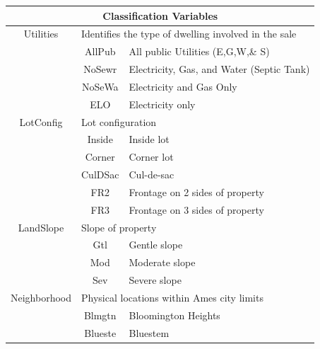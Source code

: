 \documentclass[11pt]{scrartcl} %
\begin{document}
\begin{center}
\begin{tabular}{c c c c c c}
\hline
\multicolumn{6}{|c|}{Classification Variables}\\
\hline
\multicolumn{2}{|c}{Utilities} & \multicolumn{4}{l|}{Identifies the type of dwelling involved in the sale}\\ 
\multicolumn{2}{|c}{} & \multicolumn{1}{c}{AllPub} & \multicolumn{3}{l|}{All public Utilities (E,G,W,\& S)	}\\
\multicolumn{2}{|c}{} & \multicolumn{1}{c}{NoSewr} & \multicolumn{3}{l|}{Electricity, Gas, and Water (Septic Tank)}\\
\multicolumn{2}{|c}{} & \multicolumn{1}{c}{NoSeWa} & \multicolumn{3}{l|}{Electricity and Gas Only}\\
\multicolumn{2}{|c}{} & \multicolumn{1}{c}{ELO} & \multicolumn{3}{l|}{Electricity only}\\
\hline
\multicolumn{2}{|c}{LotConfig} & \multicolumn{4}{l|}{Lot configuration}\\ 
\multicolumn{2}{|c}{} & \multicolumn{1}{c}{Inside} & \multicolumn{3}{l|}{Inside lot}\\
\multicolumn{2}{|c}{} & \multicolumn{1}{c}{Corner} & \multicolumn{3}{l|}{Corner lot}\\
\multicolumn{2}{|c}{} & \multicolumn{1}{c}{CulDSac} & \multicolumn{3}{l|}{Cul-de-sac}\\
\multicolumn{2}{|c}{} & \multicolumn{1}{c}{FR2} & \multicolumn{3}{l|}{Frontage on 2 sides of property}\\
\multicolumn{2}{|c}{} & \multicolumn{1}{c}{FR3} & \multicolumn{3}{l|}{Frontage on 3 sides of property}\\
\hline
\multicolumn{2}{|c}{LandSlope} & \multicolumn{4}{l|}{Slope of property}\\ 
\multicolumn{2}{|c}{} & \multicolumn{1}{c}{Gtl} & \multicolumn{3}{l|}{Gentle slope}\\
\multicolumn{2}{|c}{} & \multicolumn{1}{c}{Mod} & \multicolumn{3}{l|}{Moderate slope}\\
\multicolumn{2}{|c}{} & \multicolumn{1}{c}{Sev} & \multicolumn{3}{l|}{Severe slope}\\
\hline
\multicolumn{2}{|c}{Neighborhood} & \multicolumn{4}{l|}{Physical locations within Ames city limits}\\ 
\multicolumn{2}{|c}{} & \multicolumn{1}{c}{Blmgtn} & \multicolumn{3}{l|}{Bloomington Heights}\\
\multicolumn{2}{|c}{} & \multicolumn{1}{c}{Blueste} & \multicolumn{3}{l|}{Bluestem}\\

\end{tabular}
\end{center}
\end{document}
